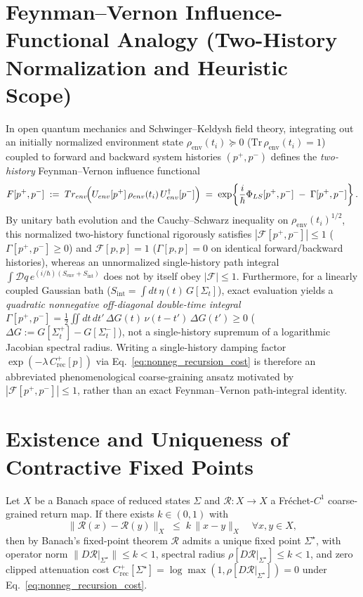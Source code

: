 \section{Feynman--Vernon Influence-Functional Analogy (Two-History Normalization and Heuristic Scope)}
\label{appendix:FV-recursion}
In open quantum mechanics and Schwinger--Keldysh field theory, integrating out an initially normalized environment state $\rho_{\mathrm{env}}(t_i) \succeq 0$ ($\mathrm{Tr}\,\rho_{\mathrm{env}}(t_i) = 1$) coupled to forward and backward system histories $(p^+, p^-)$ defines the \emph{two-history} Feynman--Vernon influence functional
\[
\mathcal{F}[p^+, p^-] \;:=\; \mathrm{Tr}_{\mathrm{env}}\!\Bigl(U_{\mathrm{env}}[p^+]\,\rho_{\mathrm{env}}(t_i)\,U_{\mathrm{env}}^\dagger[p^-]\Bigr)
\;=\; \exp\!\left\{\frac{i}{\hbar}\Phi_{\mathrm{LS}}[p^+, p^-] \;-\; \Gamma[p^+, p^-]\right\}.
\]
By unitary bath evolution and the Cauchy--Schwarz inequality on $\rho_{\mathrm{env}}(t_i)^{1/2}$, this normalized two-history functional rigorously satisfies $|\mathcal{F}[p^+, p^-]| \le 1$ ($\Gamma[p^+, p^-] \ge 0$) and $\mathcal{F}[p, p] = 1$ ($\Gamma[p, p] = 0$ on identical forward/backward histories), whereas an unnormalized single-history path integral $\int\mathcal{D}q\,e^{(i/\hbar)(S_{\mathrm{env}}+S_{\mathrm{int}})}$ does not by itself obey $|\mathcal{F}| \le 1$. Furthermore, for a linearly coupled Gaussian bath ($S_{\mathrm{int}} = \int dt\,\eta(t)\,G[\Sigma_t]$), exact evaluation yields a \emph{quadratic nonnegative off-diagonal double-time integral} $\Gamma[p^+, p^-] = \frac{1}{2}\iint dt\,dt'\,\Delta G(t)\,\nu(t-t')\,\Delta G(t') \ge 0$ ($\Delta G := G[\Sigma_t^+] - G[\Sigma_t^-]$), not a single-history supremum of a logarithmic Jacobian spectral radius. Writing a single-history damping factor $\exp(-\lambda\,C_{\mathrm{rec}}^+[p])$ via Eq.~\eqref{eq:nonneg_recursion_cost} is therefore an abbreviated phenomenological coarse-graining ansatz motivated by $|\mathcal{F}[p^+, p^-]| \le 1$, rather than an exact Feynman--Vernon path-integral identity.

\section{Existence and Uniqueness of Contractive Fixed Points}
\label{sec:fixed-point}
\label{app:clean-recursion}
Let $X$ be a Banach space of reduced states $\Sigma$ and $\mathcal{R}:X\to X$ a Fr\'echet-$C^1$ coarse-grained return map. If there exists $k\in(0,1)$ with
\[
\|\mathcal{R}(x) - \mathcal{R}(y)\|_X \;\le\; k\,\|x - y\|_X \quad\forall x,y\in X,
\]
then by Banach's fixed-point theorem $\mathcal{R}$ admits a unique fixed point $\Sigma^\star$, with operator norm $\|D\mathcal{R}|_{\Sigma^\star}\| \le k < 1$, spectral radius $\rho[D\mathcal{R}|_{\Sigma^\star}] \le k < 1$, and zero clipped attenuation cost $C_{\mathrm{rec}}^+[\Sigma^\star] = \log\max(1, \rho[D\mathcal{R}|_{\Sigma^\star}]) = 0$ under Eq.~\eqref{eq:nonneg_recursion_cost}.

